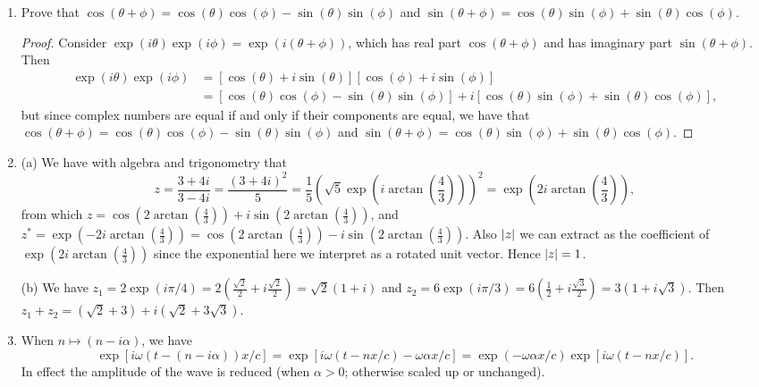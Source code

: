 \documentclass[11pt]{article}
\begin{document}
\begin{enumerate}[label=18.\arabic*]
    \item Prove that $\cos(\theta + \phi) = \cos(\theta)\cos(\phi) - \sin(\theta)\sin(\phi)$ and $\sin(\theta + \phi) = \cos(\theta)\sin(\phi) + \sin(\theta)\cos(\phi)$.
    \begin{proof}
        Consider $\exp(i\theta)\exp(i\phi) = \exp(i(\theta + \phi))$, which has real part $\cos(\theta + \phi)$ and has imaginary part $\sin(\theta + \phi)$. Then 
        \begin{align*}
            \exp(i\theta)\exp(i\phi) &= [\cos(\theta) + i\sin(\theta)][\cos(\phi) + i\sin(\phi)] \\
            &= [\cos(\theta)\cos(\phi) - \sin(\theta)\sin(\phi)] + i[\cos(\theta)\sin(\phi) + \sin(\theta)\cos(\phi)],
        \end{align*}
        but since complex numbers are equal if and only if their components are equal, we have that $\cos(\theta + \phi) = \cos(\theta)\cos(\phi) - \sin(\theta)\sin(\phi)$ and $\sin(\theta + \phi) = \cos(\theta)\sin(\phi) + \sin(\theta)\cos(\phi)$.
    \end{proof}
    \item (a) We have with algebra and trigonometry that \[z = \frac{3+4i}{3-4i} = \frac{(3+4i)^2}{5} = \frac{1}{5}\left(\sqrt{5}\exp(i\arctan(\frac{4}{3}))\right)^2 = \exp(2i\arctan(\frac{4}{3})),\]
    from which $z = \cos(2\arctan(\frac{4}{3})) + i\sin(2\arctan(\frac{4}{3}))$, and $z^{\ast} = \exp(-2i\arctan(\frac{4}{3})) = \cos(2\arctan(\frac{4}{3})) - i\sin(2\arctan(\frac{4}{3}))$. Also $\abs{z}$ we can extract as the coefficient of $\exp(2i\arctan(\frac{4}{3}))$ since the exponential here we interpret as a rotated unit vector. Hence $\abs{z} = 1$.

    (b) We have $z_1 = 2\exp(i\pi/4) = 2(\frac{\sqrt{2}}{2} + i\frac{\sqrt{2}}{2}) = \sqrt{2}(1 + i)$ and $z_2 = 6\exp(i\pi/3) = 6(\frac{1}{2} + i\frac{\sqrt{3}}{2}) = 3(1 + i\sqrt{3})$.
    Then $z_1 + z_2 = (\sqrt{2} + 3) + i(\sqrt{2} + 3\sqrt{3})$.
    \item When $n\mapsto (n-i\alpha)$, we have \[\exp[i\omega(t-(n-i\alpha))x/c] = \exp[i\omega(t-nx/c) - \omega\alpha x/c] = \exp(- \omega\alpha x/c)\exp[i\omega(t-nx/c)].\]
    In effect the amplitude of the wave is reduced (when $\alpha > 0$; otherwise scaled up or unchanged).
\end{enumerate}
\end{document}
